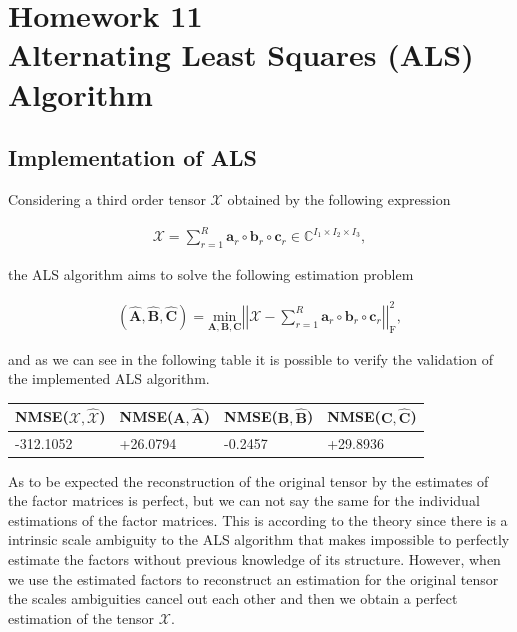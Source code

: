 \documentclass[a4paper,10pt]{article}
\begin{document}
\newpage
\section*{Homework 11 \\ Alternating Least Squares (ALS) Algorithm}

    \subsection*{Implementation of ALS}

    Considering a third order tensor $\mathcal{X}$ obtained by the following expression

    \begin{align}
        \mathcal{X} = \sum^{R}_{r = 1} \boldsymbol{a}_{r} \circ \boldsymbol{b}_{r} \circ \boldsymbol{c}_{r} \in \mathbb{C}^{I_{1} \times I_{2} \times I_{3}},  
    \end{align}
    
    the ALS algorithm aims to solve the following estimation problem

    \begin{align}
        \left(\hat{\boldsymbol{A}}, \hat{\boldsymbol{B}}, \hat{\boldsymbol{C}}\right) = \underset{\boldsymbol{A}, \boldsymbol{B}, \boldsymbol{C}}{\text{min}} \left| \left| \mathcal{X} - \sum^{R}_{r = 1} \boldsymbol{a}_{r} \circ \boldsymbol{b}_{r} \circ \boldsymbol{c}_{r} \right| \right|^{2}_{\text{F}},
    \end{align}

    and as we can see in the following table it is possible to verify the validation of the implemented ALS algorithm. 
    
    \begin{table}[ht!]
        \centering
        \begin{tabular}{|l|l|l|l|}
        \hline
        NMSE($\mathcal{X}, \mathcal{\hat{X}}$) & NMSE($\boldsymbol{A}, \boldsymbol{\hat{A}}$) & NMSE($\boldsymbol{B}, \boldsymbol{\hat{B}}$) & NMSE($\boldsymbol{C}, \boldsymbol{\hat{C}}$) \\ \hline
        -312.1052 & +26.0794 & -0.2457 & +29.8936 \\ \hline
        \end{tabular}
    \end{table}
    
    As to be expected the reconstruction of the original tensor by the estimates of the factor matrices is perfect, but we can not say the same 
    for the individual estimations of the factor matrices. This is according to the theory since there is a intrinsic scale ambiguity to the ALS
    algorithm that makes impossible to perfectly estimate the factors without previous knowledge of its structure. However, when we use the estimated factors
    to reconstruct an estimation for the original tensor the scales ambiguities cancel out each other and then we obtain a perfect estimation of the tensor $\mathcal{X}$.
\end{document}
